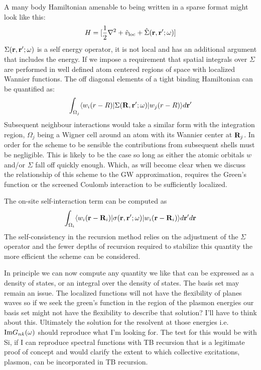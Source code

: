A many body Hamiltonian amenable to being written in a sparse format might look like this:
%
\begin{equation}
H = [\frac{1}{2}\nabla^{2} + \tilde{v}_{\rm loc} + \hat{\Sigma}({\bf r},{\bf r}';\omega)]
\end{equation}
%
	$\Sigma({\bf r},{\bf r}';\omega)$ is a self energy operator, it is not local and 
has an additional argument that includes the energy.
If we impose a requirement that spatial integrals over $\Sigma$ are performed in 
well defined atom centered regions of space with localized Wannier functions. 
The off diagonal elements of a tight binding Hamiltonian can be quantified as:
%
\begin{equation}
\int_{\Omega_{j}}\langle w_{i}(r-R)|\Sigma({\bf R},{\bf r}';\omega)|w_{j}(r-R)\rangle d{\bf r}'
\end{equation}
%
	Subsequent neighbour interactions would take a similar form
with the integration region, $\Omega_{j}$ being a Wigner cell around an 
atom with its Wannier center at ${\bf R}_j$. In order for the scheme to be sensible the contributions from subsequent shells 
must be negligible. This is likely to be the case so long as either the atomic orbitals $w$ and/or $\Sigma$ 
fall off quickly enough. Which, as will become clear when we discuss
the relationship of this scheme to the GW approximation, requires 
the Green's function or the screened Coulomb interaction to be sufficiently localized.

The on-site self-interaction term can be computed as
%
\begin{equation}
\int_{\Omega_{i}}\langle w_{i}({\bf r}-{\bf R}_{i})|\sigma({\bf r},{\bf r}';\omega)|w_{i}({\bf r}-{\bf R}_{i})\rangle d{\bf r}'d{\bf r}
\end{equation}
%
The self-consistency in the recursion method relies on the adjustment of the $\Sigma$ operator 
and the fewer depths of recursion required to stabilize this quantity the more efficient the
scheme can be considered.

In principle we can now compute any quantity we like that can be expressed
as a density of states, or an integral over the density of states.
The basis set may remain an issue. The localized functions will not have the 
flexibility of planes waves so if we seek the green's function in the 
region of the plasmon energies our basis set might not have the flexibility 
to describe that solution? I'll have to think about this. Ultimately the 
solution for the resolvent at those energies i.e. ${\rm Im} G_{nk}(\omega)$ should 
reproduce what I'm looking for. The test for this would be with Si, if 
I can reproduce spectral functions with TB recursion that is a legitimate 
proof of concept and would clarify the extent to which collective excitations,
plasmon, can be incorporated in TB recursion. 

